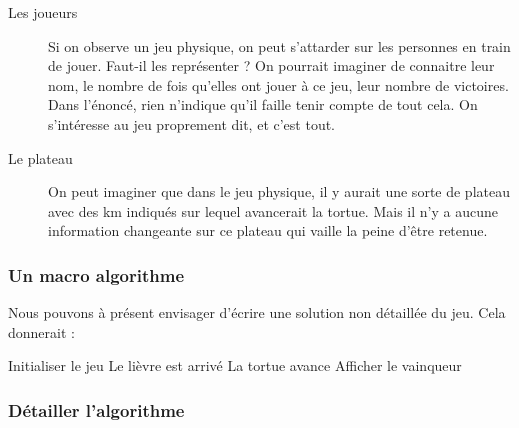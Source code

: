 \begin{description}
			\item[Les joueurs]
				Si on observe un jeu physique,
				on peut s'attarder sur les personnes en train de jouer.
				Faut-il les représenter ?
				On pourrait imaginer de connaitre leur nom,
				le nombre de fois qu'elles ont jouer à ce jeu,
				leur nombre de victoires.
				Dans l'énoncé, 
				rien n'indique qu'il faille tenir compte de tout cela. 
				On s'intéresse au jeu proprement dit, et c'est tout.
			\item[Le plateau]
				On peut imaginer que dans le jeu physique,
				il y aurait une sorte de plateau 
				avec des km indiqués
				sur lequel avancerait la tortue.
				Mais il n'y a aucune information changeante
				sur ce plateau qui vaille la peine d'être retenue.
			\end{description}

		\subsubsection*{Un macro algorithme}
				
			Nous pouvons à présent envisager d'écrire une solution
			non détaillée du jeu.
			Cela donnerait :
			
			\begin{LDA}
					\Stmt Initialiser le jeu
							\Stmt Le lièvre est arrivé
						\Else
							\Stmt La tortue avance
						\EndIf
					\EndWhile
					\Stmt Afficher le vainqueur
				\EndAlgo
			\end{LDA}
			
		\subsubsection*{Détailler l'algorithme}
	

